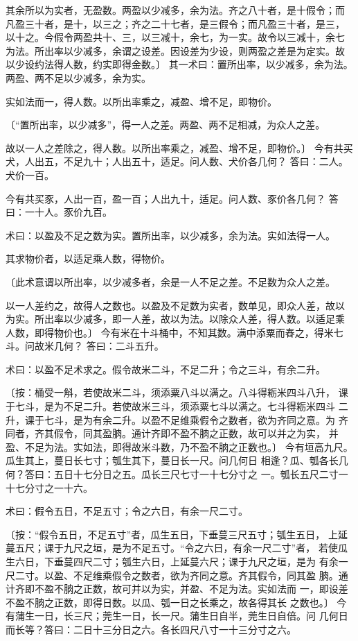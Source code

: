 \documentclass[12pt,UTF8]{ctexbook}
\begin{document}
其余所以为实者，无盈数。两盈以少减多，余为法。齐之八十者，是十假令；而 凡盈三十者，是十，以三之；齐之二十七者，是三假令；而凡盈三十者，是三， 以十之。今假令两盈共十、三，以三减十，余七，为一实。故令以三减十，余七 为法。所出率以少减多，余谓之设差。因设差为少设，则两盈之差是为定实。故 以少设约法得人数，约实即得金数。〕 其一术曰：置所出率，以少减多，余为法。两盈、两不足以少减多，余为实。

实如法而一，得人数。以所出率乘之，减盈、增不足，即物价。

〔“置所出率，以少减多”，得一人之差。两盈、两不足相减，为众人之差。

故以一人之差除之，得人数。以所出率乘之，减盈、增不足，即物价。〕 今有共买犬，人出五，不足九十；人出五十，适足。问人数、犬价各几何？ 答曰：二人。犬价一百。

今有共买豕，人出一百，盈一百；人出九十，适足。问人数、豕价各几何？ 答曰：一十人。豕价九百。

术曰：以盈及不足之数为实。置所出率，以少减多，余为法。实如法得一人。

其求物价者，以适足乘人数，得物价。

〔此术意谓以所出率，以少减多者，余是一人不足之差。不足数为众人之差。

以一人差约之，故得人之数也。以盈及不足数为实者，数单见，即众人差，故以 为实。所出率以少减多，即一人差，故以为法。以除众人差，得人数。以适足乘 人数，即得物价也。〕 今有米在十斗桶中，不知其数。满中添粟而舂之，得米七斗。问故米几何？ 答曰：二斗五升。

术曰：以盈不足术求之。假令故米二斗，不足二升；令之三斗，有余二升。

〔按：桶受一斛，若使故米二斗，须添粟八斗以满之。八斗得粝米四斗八升， 课于七斗，是为不足二升。若使故米三斗，须添粟七斗以满之。七斗得粝米四斗 二升，课于七斗，是为有余二升。以盈不足维乘假令之数者，欲为齐同之意。为 齐同者，齐其假令，同其盈朒。通计齐即不盈不朒之正数，故可以并之为实， 并盈、不足为法。实如法，即得故米斗数，乃不盈不朒之正数也。〕 今有垣高九尺。瓜生其上，蔓日长七寸；瓠生其下，蔓日长一尺。问几何日 相逢？瓜、瓠各长几何？答曰：五日十七分日之五。瓜长三尺七寸一十七分寸之 一。瓠长五尺二寸一十七分寸之一十六。

术曰：假令五日，不足五寸；令之六日，有余一尺二寸。

〔按：“假令五日，不足五寸”者，瓜生五日，下垂蔓三尺五寸；瓠生五日， 上延蔓五尺；课于九尺之垣，是为不足五寸。“令之六日，有余一尺二寸”者， 若使瓜生六日，下垂蔓四尺二寸；瓠生六日，上延蔓六尺；课于九尺之垣，是为 有余一尺二寸。以盈、不足维乘假令之数者，欲为齐同之意。齐其假令，同其盈 朒。通计齐即不盈不朒之正数，故可并以为实，并盈、不足为法。实如法而 一，即设差不盈不朒之正数，即得日数。以瓜、瓠一日之长乘之，故各得其长 之数也。〕 今有蒲生一日，长三尺；莞生一日，长一尺。蒲生日自半，莞生日自倍。问 几何日而长等？答曰：二日十三分日之六。各长四尺八寸一十三分寸之六。
\end{document}
